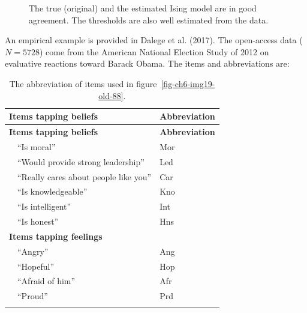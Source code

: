 \documentclass[
  a4paper,
  DIV=11,
  numbers=noendperiod,
  oneside]{scrreprt}
\begin{document}
\begin{figure}


\caption{\label{fig-ch6-img18-old-87}The true (original) and the
estimated Ising model are in good agreement. The thresholds are also
well estimated from the data.}

\end{figure}%

An empirical example is provided in Dalege et al. (2017). The
open-access data (\(N = 5728\)) come from the American National Election
Study of 2012 on evaluative reactions toward Barack Obama. The items and
abbreviations are:

\begin{longtable}[]{@{}ll@{}}
\toprule\noalign{}
\textbf{Items tapping beliefs} & \textbf{Abbreviation} \\
\midrule\noalign{}
\endfirsthead
\toprule\noalign{}
\textbf{Items tapping beliefs} & \textbf{Abbreviation} \\
\midrule\noalign{}
\endhead
\bottomrule\noalign{}
\endlastfoot
 ``Is moral'' & Mor \\
 ``Would provide strong leadership'' & Led \\
 ``Really cares about people like you'' & Car \\
 ``Is knowledgeable'' & Kno \\
 ``Is intelligent'' & Int \\
 ``Is honest'' & Hns \\
\textbf{Items tapping feelings} & \\
 ``Angry'' & Ang \\
 ``Hopeful'' & Hop \\
 ``Afraid of him'' & Afr \\
 ``Proud'' & Prd \\
\caption{The abbreviation of items used in
figure~\ref{fig-ch6-img19-old-88}.}\label{tbl-obama-table}\tabularnewline
\end{longtable}
\end{document}
